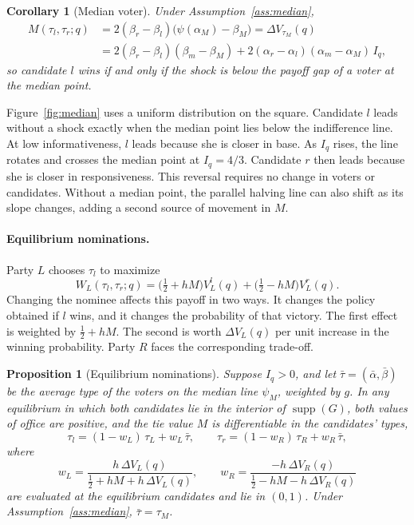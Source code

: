 \documentclass[12pt,letterpaper]{article}
\newtheorem{corollary}{Corollary}
\newtheorem{proposition}{Proposition}
\begin{document}
\begin{corollary}[Median voter]\label{cor:median}
Under Assumption~\ref{ass:median},
\begin{align*}
M(\tau_l,\tau_r;q)
&=2(\beta_r-\beta_l)\big(\psi(\alpha_M)-\beta_M\big)=\Delta V_{\tau_M}(q)\\
&=2(\beta_r-\beta_l)(\beta_m-\beta_M)+2(\alpha_r-\alpha_l)(\alpha_m-\alpha_M)\,I_q ,
\end{align*}
so candidate $l$ wins if and only if the shock is below the payoff gap of a voter at the median point.
\end{corollary}

Figure~\ref{fig:median} uses a uniform distribution on the square. Candidate $l$ leads without a shock exactly when the median point lies below the indifference line. At low informativeness, $l$ leads because she is closer in base. As $I_q$ rises, the line rotates and crosses the median point at $I_q=4/3$. Candidate $r$ then leads because she is closer in responsiveness. This reversal requires no change in voters or candidates. Without a median point, the parallel halving line can also shift as its slope changes, adding a second source of movement in $M$.

\paragraph{Equilibrium nominations.}
Party $L$ chooses $\tau_l$ to maximize
\[
W_L(\tau_l,\tau_r;q)=\Big(\tfrac12+hM\Big)V_L^l(q)+\Big(\tfrac12-hM\Big)V_L^r(q).
\]
Changing the nominee affects this payoff in two ways. It changes the policy obtained if $l$ wins, and it changes the probability of that victory. The first effect is weighted by $\tfrac12+hM$. The second is worth $\Delta V_L(q)$ per unit increase in the winning probability. Party $R$ faces the corresponding trade-off.

\begin{proposition}[Equilibrium nominations]\label{prop:nomination}
Suppose $I_q>0$, and let $\bar\tau=(\bar\alpha,\bar\beta)$ be the average type of the voters on the median line $\psi_M$, weighted by $g$. In any equilibrium in which both candidates lie in the interior of $\operatorname{supp}(G)$, both values of office are positive, and the tie value $M$ is differentiable in the candidates' types,
\[
\tau_l=(1-w_L)\,\tau_L+w_L\,\bar\tau,
\qquad
\tau_r=(1-w_R)\,\tau_R+w_R\,\bar\tau,
\]
where
\[
w_L=\frac{h\,\Delta V_L(q)}{\tfrac12+hM+h\,\Delta V_L(q)},
\qquad
w_R=\frac{-h\,\Delta V_R(q)}{\tfrac12-hM-h\,\Delta V_R(q)}
\]
are evaluated at the equilibrium candidates and lie in $(0,1)$. Under Assumption~\ref{ass:median}, $\bar\tau=\tau_M$.
\end{proposition}
\end{document}
